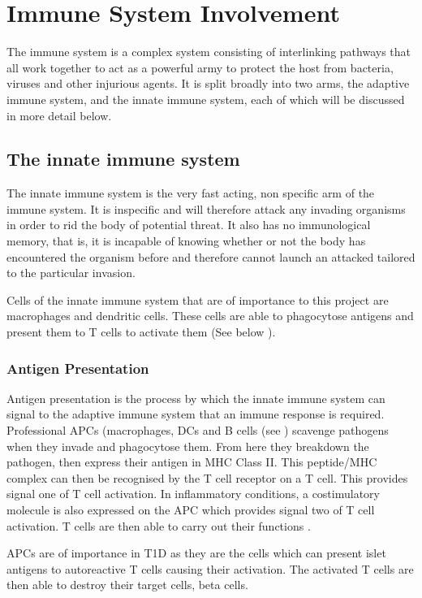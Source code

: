 \section{Immune System Involvement}

The immune system is a complex system consisting of interlinking pathways that all work together to act as a powerful army to protect the host from bacteria, viruses and other injurious agents.
It is split broadly into two arms, the adaptive immune system, and the innate immune system, each of which will be discussed in more detail below.


\subsection{The innate immune system}
The innate immune system is the very fast acting, non specific arm of the immune system.
It is inspecific and will therefore attack any invading organisms in order to rid the body of potential threat.
It also has no immunological memory, that is, it is incapable of knowing whether or not the body has encountered the organism before and therefore cannot launch an attacked tailored to the particular invasion.

Cells of the innate immune system that are of importance to this project are macrophages and dendritic cells.
These cells are able to phagocytose antigens and present them to T cells to activate them (See below ).

\subsubsection{Antigen Presentation}

Antigen presentation is the process by which the innate immune system can signal to the adaptive immune system that an immune response is required.
Professional APCs (macrophages, DCs and B cells (see ) scavenge pathogens when they invade and phagocytose them.
From here they breakdown the pathogen, then express their antigen in MHC Class II.
This peptide/MHC complex can then be recognised by the T cell receptor on a T cell.
This provides signal one of T cell activation.
In inflammatory conditions, a costimulatory molecule is also expressed on the APC which provides signal two of T cell activation.
T cells are then able to carry out their functions .

APCs are of importance in T1D as they are the cells which can present islet antigens to autoreactive T cells causing their activation.
The activated T cells are then able to destroy their target cells, beta cells.


